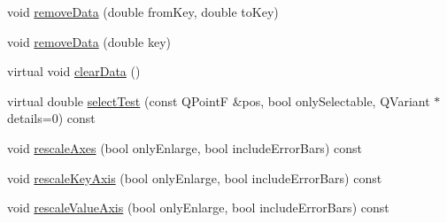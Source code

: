 \begin{DoxyCompactItemize}
void \hyperlink{classQCPGraph_a4a0fde50b7db9db0a85b5c5b6b10098f}{remove\-Data} (double from\-Key, double to\-Key)
\item 
void \hyperlink{classQCPGraph_a4a706020b4318f118381648ef18aca3f}{remove\-Data} (double key)
\item 
virtual void \hyperlink{classQCPGraph_ad4e94a4e44e5e76fbec81a72a977157d}{clear\-Data} ()
\item 
virtual double \hyperlink{classQCPGraph_abc9ff375aabcf2d21cca33d6baf85772}{select\-Test} (const \-Q\-Point\-F \&pos, bool only\-Selectable, \-Q\-Variant $\ast$details=0) const 
\item 
void \hyperlink{classQCPGraph_aa35b75b9032800d783df749c8a004ee9}{rescale\-Axes} (bool only\-Enlarge, bool include\-Error\-Bars) const 
\item 
void \hyperlink{classQCPGraph_a2108a729046b0ab6e0516afb249dab13}{rescale\-Key\-Axis} (bool only\-Enlarge, bool include\-Error\-Bars) const 
\item 
void \hyperlink{classQCPGraph_a2ba0e1df416486d7e74299ef8cf68bba}{rescale\-Value\-Axis} (bool only\-Enlarge, bool include\-Error\-Bars) const 
\end{DoxyCompactItemize}
